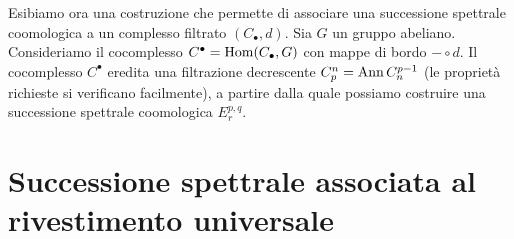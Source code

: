 Esibiamo ora una costruzione che permette di associare una successione spettrale coomologica a un complesso filtrato $(C_\bullet, d)$. Sia $G$ un gruppo abeliano. Consideriamo il cocomplesso $C^\bullet=\operatorname{Hom}(C_\bullet,G)$ con mappe di bordo $-\circ d$. Il cocomplesso $C^\bullet$ eredita una filtrazione decrescente $C^n_p=\operatorname{Ann} C_n^{p-1}$ (le proprietà richieste si verificano facilmente), a partire dalla quale possiamo costruire una successione spettrale coomologica $E^{p,q}_r$.

\section{Successione spettrale associata al rivestimento universale}